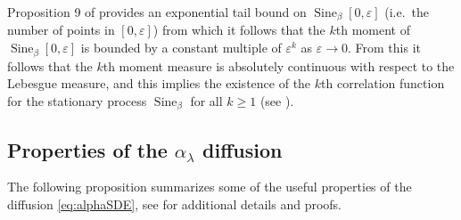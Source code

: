 \documentclass[12pt]{article}
\theoremstyle{definition} %
\newcommand{\eps}{\varepsilon}
\theoremstyle{remark} %
\newcommand{\Sineb}{\operatorname{Sine}_{\beta}}
\begin{document}
Proposition 9 of \cite{BVBV} provides an exponential tail bound on $\Sineb[0,\eps]$ (i.e.~the number of points in $[0,\eps]$) from which it follows that the $k$th moment of $\Sineb[0,\eps]$ is bounded by a constant multiple of $\eps^k$ as $\eps\to 0$. From this it follows that the $k$th moment measure is absolutely continuous with respect to the Lebesgue measure, and this implies the existence of the $k$th correlation  function for the stationary process $\Sineb$ for all $k\ge 1$ (see \cite{DVJ1}).


\subsection{Properties of the $\alpha_\lambda$ diffusion}


The following proposition summarizes some of the useful properties of the diffusion \eqref{eq:alphaSDE},  see \cite{LV_HP} for additional details and proofs.
\end{document}
